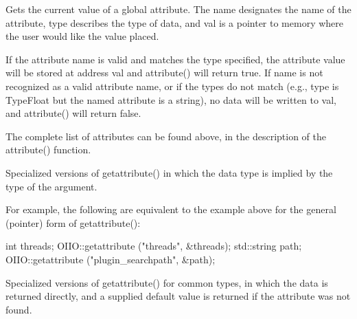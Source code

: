 
Gets the current value of a global attribute.  The {\cf name} designates
the name of the attribute, {\cf type} describes the type of data, and
{\cf val} is a pointer to memory where the user would like the value
placed.

If the attribute name is valid and matches the type specified, the
attribute value will be stored at address {\cf val} and {\cf
  attribute()} will return {\cf true}.  If {\cf name} is not recognized
as a valid attribute name, or if the types do not match (e.g., {\cf
  type} is {\cf TypeFloat} but the named attribute is a
string), no data will be written to {\cf val}, and {\cf attribute()}
will return {\cf false}.

The complete list of attributes can be found above, in the description
of the {\cf attribute()} function.
\apiend

Specialized versions of {\cf getattribute()} in which the data type is
implied by the type of the argument.

For example, the following are equivalent to the example above for the
general (pointer) form of {\cf getattribute()}:

\begin{code}
      int threads;
      OIIO::getattribute ("threads", &threads);
      std::string path;
      OIIO::getattribute ("plugin_searchpath", &path);
\end{code}
\apiend

 
Specialized versions of {\cf getattribute()} for common types, in which the
data is returned directly, and a supplied default value is returned if the
attribute was not found.

